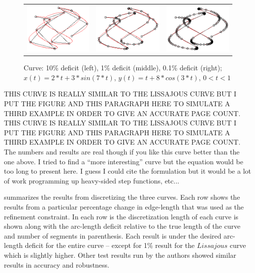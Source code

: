 \begin{figure}[h!]
  \centering
  \begin{tabular}{ccc}
  \includegraphics[width=0.3\linewidth]{Figures/random01.png} &
  \includegraphics[width=0.3\linewidth]{Figures/random001.png} &
  \includegraphics[width=0.3\linewidth]{Figures/random0001.png}
  \end{tabular}
  \caption{\label{fig:lastfigure} Curve: 10\% deficit (left), 1\% deficit (middle), 0.1\% deficit (right);\newline $x(t) = 2*t + 3*sin(7*t)$, $y(t) = t + 8*cos(3*t)$, $0<t<1$}
\end{figure}

THIS CURVE IS REALLY SIMILAR TO THE LISSAJOUS CURVE BUT I PUT THE FIGURE AND THIS PARAGRAPH HERE TO SIMULATE A THIRD EXAMPLE IN ORDER TO GIVE AN ACCURATE PAGE COUNT. THIS CURVE IS REALLY SIMILAR TO THE LISSAJOUS CURVE BUT I PUT THE FIGURE AND THIS PARAGRAPH HERE TO SIMULATE A THIRD EXAMPLE IN ORDER TO GIVE AN ACCURATE PAGE COUNT. The numbers and results are real though if you like this curve better than the one above. I tried to find a ``more interesting'' curve but the equation would be too long to present here. I guess I could cite the formulation but it would be a lot of work programming up heavy-sided step functions, etc...

 summarizes the results from discretizing the three curves. Each row shows the results from a particular percentage change in edge-length that was used as the refinement constraint. In each row is the discretization length of each curve is shown along with the arc-length deficit relative to the true length of the curve and number of segments in parenthesis. Each result is under the desired arc-length deficit for the entire curve -- except for 1\% result for the $Lissajous$ curve which is slightly higher. Other test results run by the authors showed similar results in accuracy and robustness.

